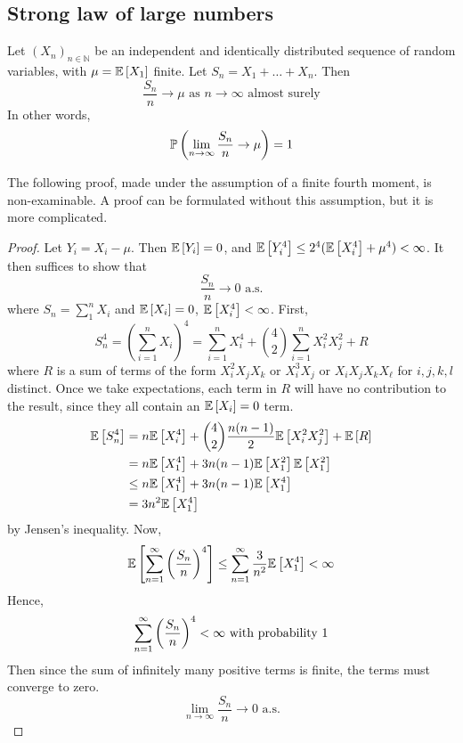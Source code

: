\subsection{Strong law of large numbers}
\begin{theorem}
	Let \((X_n)_{n \in \mathbb N}\) be an independent and identically distributed sequence of random variables, with \(\mu = \mathbb{E}\left[{X_1}\right]\) finite.
	Let \(S_n = X_1 + \dots + X_n\).
	Then
	\[
		\frac{S_n}{n} \to \mu \text{ as } n \to \infty \text{ almost surely}
	\]
	In other words,
	\[
		\mathbb{P}\left({\lim_{n \to \infty}\frac{S_n}{n}\to \mu}\right) = 1
	\]
\end{theorem}
\noindent The following proof, made under the assumption of a finite fourth moment, is non-examinable.
A proof can be formulated without this assumption, but it is more complicated.
\begin{proof}
	Let \(Y_i = X_i - \mu\).
	Then \(\mathbb{E}\left[{Y_i}\right] = 0\), and \(\mathbb{E}\left[{Y_i^4}\right] \leq 2^4(\mathbb{E}\left[{X_i^4}\right] + \mu^4) < \infty\).
	It then suffices to show that
	\[
		\frac{S_n}{n} \to 0 \text{ a.s.}
	\]
	where \(S_n = \sum_1^n X_i\) and \(\mathbb{E}\left[{X_i}\right] = 0\), \(\mathbb{E}\left[{X_i^4}\right] < \infty\).
	First,
	\[
		S_n^4 = \left( \sum_{i=1}^n X_i \right)^4 = \sum_{i=1}^n X_i^4 + \binom{4}{2}\sum_{i=1}^n X_i^2 X_j^2 + R
	\]
	where \(R\) is a sum of terms of the form \(X_i^2 X_j X_k\) or \(X_i^3 X_j\) or \(X_i X_j X_k X_\ell\) for \(i, j, k, l\) distinct.
	Once we take expectations, each term in \(R\) will have no contribution to the result, since they all contain an \(\mathbb{E}\left[{X_i}\right] = 0\) term.
	\begin{align*}
		\mathbb{E}\left[{S_n^4}\right] & = n\mathbb{E}\left[{X_i^4}\right] + \binom{4}{2}\frac{n(n-1)}{2}\mathbb{E}\left[{X_i^2 X_j^2}\right] + \mathbb{E}\left[{R}\right] \\
		               & = n\mathbb{E}\left[{X_1^4}\right] + 3n(n-1)\mathbb{E}\left[{X_1^2}\right]\mathbb{E}\left[{X_1^2}\right]                           \\
		               & \leq n\mathbb{E}\left[{X_1^4}\right] + 3n(n-1)\mathbb{E}\left[{X_1^4}\right]                                      \\
		               & = 3n^2\mathbb{E}\left[{X_1^4}\right]
	\end{align*}
	by Jensen's inequality.
	Now,
	\[
		\mathbb{E}\left[{\sum_{n=1}^\infty \qty(\frac{S_n}{n})^4}\right] \leq \sum_{n=1}^\infty \frac{3}{n^2}\mathbb{E}\left[{X_1^4}\right] < \infty
	\]
	Hence,
	\[
		\sum_{n=1}^\infty \qty(\frac{S_n}{n})^4 < \infty \text{ with probability 1}
	\]
	Then since the sum of infinitely many positive terms is finite, the terms must converge to zero.
	\[
		\lim_{n\to\infty}\frac{S_n}{n} \to 0 \text{ a.s.}
	\]
\end{proof}


